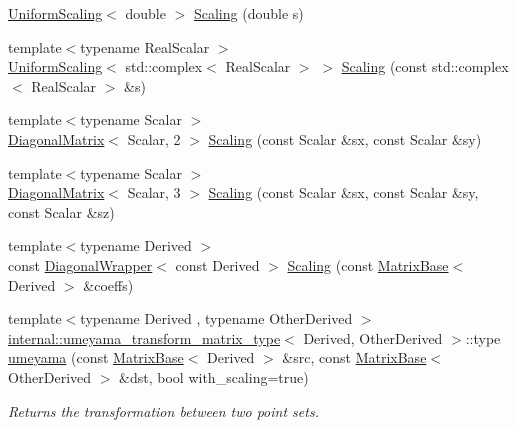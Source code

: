 \begin{DoxyCompactItemize}
\item 
\hyperlink{class_eigen_1_1_uniform_scaling}{Uniform\+Scaling}$<$ double $>$ \hyperlink{group___geometry___module_ga86bf75d7fd4a67bf9c2c7354d8e5e2af}{Scaling} (double s)
\item 
{\footnotesize template$<$typename Real\+Scalar $>$ }\\\hyperlink{class_eigen_1_1_uniform_scaling}{Uniform\+Scaling}$<$ std\+::complex$<$ Real\+Scalar $>$ $>$ \hyperlink{group___geometry___module_ga97769767c20f843fc8c60421dcf0fd45}{Scaling} (const std\+::complex$<$ Real\+Scalar $>$ \&s)
\item 
{\footnotesize template$<$typename Scalar $>$ }\\\hyperlink{group___core___module_class_eigen_1_1_diagonal_matrix}{Diagonal\+Matrix}$<$ Scalar, 2 $>$ \hyperlink{group___geometry___module_gab76ae94fe10ce570fbd130bd6c7ab06d}{Scaling} (const Scalar \&sx, const Scalar \&sy)
\item 
{\footnotesize template$<$typename Scalar $>$ }\\\hyperlink{group___core___module_class_eigen_1_1_diagonal_matrix}{Diagonal\+Matrix}$<$ Scalar, 3 $>$ \hyperlink{group___geometry___module_gacaf9cb32919d0a51876e0d204d2af475}{Scaling} (const Scalar \&sx, const Scalar \&sy, const Scalar \&sz)
\item 
{\footnotesize template$<$typename Derived $>$ }\\const \hyperlink{group___core___module_class_eigen_1_1_diagonal_wrapper}{Diagonal\+Wrapper}$<$ const Derived $>$ \hyperlink{group___geometry___module_gac8f5797ba6804cc1d4b0c8c62da3e3d7}{Scaling} (const \hyperlink{group___core___module_class_eigen_1_1_matrix_base}{Matrix\+Base}$<$ Derived $>$ \&coeffs)
\item 
{\footnotesize template$<$typename Derived , typename Other\+Derived $>$ }\\\hyperlink{struct_eigen_1_1internal_1_1umeyama__transform__matrix__type}{internal\+::umeyama\+\_\+transform\+\_\+matrix\+\_\+type}$<$ Derived, Other\+Derived $>$\+::type \hyperlink{group___geometry___module_ga033d6550c1fc82e232f2b4c380c19a54}{umeyama} (const \hyperlink{group___core___module_class_eigen_1_1_matrix_base}{Matrix\+Base}$<$ Derived $>$ \&src, const \hyperlink{group___core___module_class_eigen_1_1_matrix_base}{Matrix\+Base}$<$ Other\+Derived $>$ \&dst, bool with\+\_\+scaling=true)
\begin{DoxyCompactList}\small\item\em Returns the transformation between two point sets. \end{DoxyCompactList}\item 

\end{DoxyCompactItemize}
